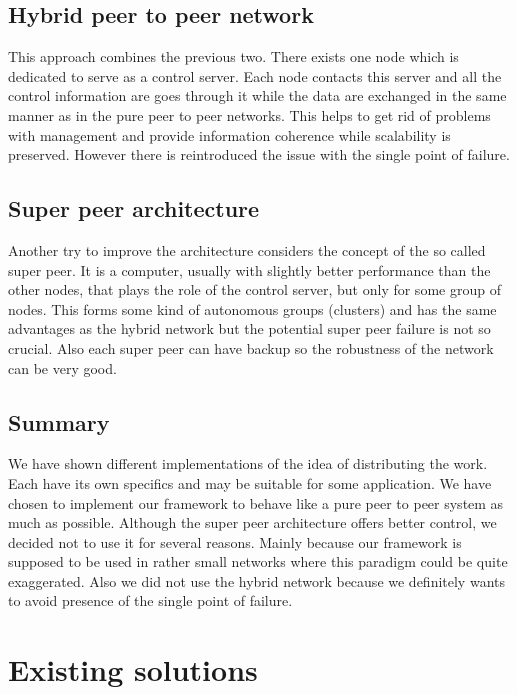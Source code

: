 \subsection*{Hybrid peer to peer network}

This approach combines the previous two. There exists one node which is
dedicated to serve as a control server. Each node contacts this server
and all the control information are goes through it while the data are
exchanged in the same manner as in the pure peer to peer networks. This
helps to get rid of problems with management and provide information
coherence while scalability is preserved. However there is reintroduced
the issue with the single point of failure.

\subsection*{Super peer architecture}

Another try to improve the architecture considers the concept of the so
called super peer. It is a computer, usually with slightly better
performance than the other nodes, that plays the role of the control
server, but only for some group of nodes. This forms some kind of
autonomous groups (clusters) and has the same advantages as the hybrid
network but the potential super peer failure is not so crucial. Also
each super peer can have backup so the robustness of the network can be
very good.

\subsection{Summary}\label{summary}

We have shown different implementations of the idea of distributing the
work. Each have its own specifics and may be suitable for some
application. We have chosen to implement our framework to behave like a
pure peer to peer system as much as possible. Although the super peer
architecture offers better control, we decided not to use it for several
reasons. Mainly because our framework is supposed to be used in rather
small networks where this paradigm could be quite exaggerated. Also we
did not use the hybrid network because we definitely wants to avoid
presence of the single point of failure.

\section{Existing solutions}\label{existing-solutions}

